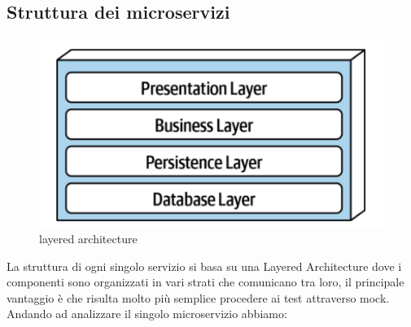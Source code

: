 \subsection{Struttura dei microservizi}
\begin{figure}[H]
	\centering
	\includegraphics[scale=0.4]{Immagini/Backend/layer.png}
	\caption{layered architecture}
	\label{fig:layer}
\end{figure}
La struttura di ogni singolo servizio si basa su una Layered Architecture dove i componenti sono organizzati in vari strati che comunicano tra loro, il principale vantaggio è che risulta molto più semplice procedere ai test attraverso mock. \\
Andando ad analizzare il singolo microservizio abbiamo:
